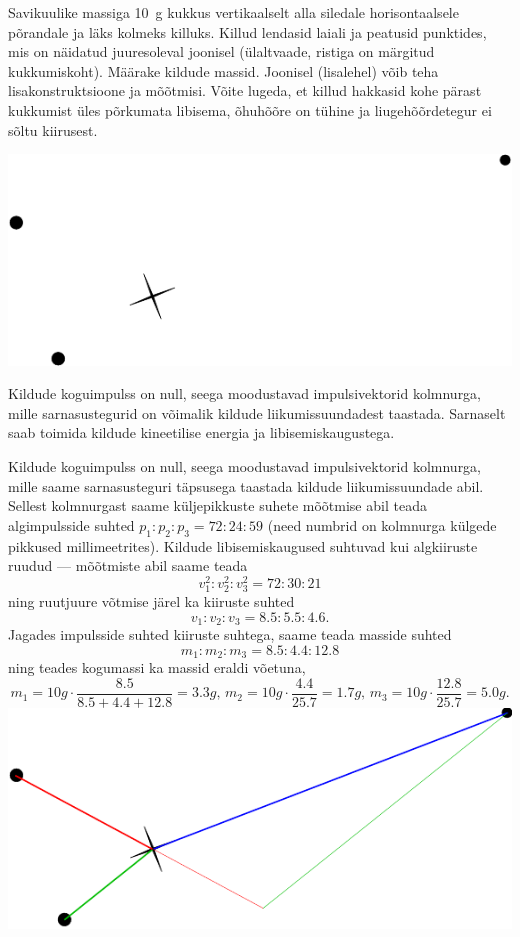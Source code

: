 
Savikuulike massiga \SI{10}{g} kukkus vertikaalselt alla siledale horisontaalsele
põrandale ja läks kolmeks killuks.
Killud lendasid laiali ja peatusid punktides, mis on näidatud juuresoleval
joonisel
(ülaltvaade, ristiga on märgitud kukkumiskoht). Määrake kildude massid.
Joonisel (lisalehel)
võib teha lisakonstruktsioone ja mõõtmisi.
Võite lugeda, et killud hakkasid kohe pärast kukkumist üles põrkumata libisema,
õhuhõõre on tühine ja liugehõõrdetegur ei sõltu kiirusest.
\begin{center}
\includegraphics[width=0.8\linewidth]{2012-lahg-10-killud}
\end{center}

\hint
Kildude koguimpulss on null, seega moodustavad impulsivektorid kolmnurga, mille sarnasustegurid on võimalik kildude liikumissuundadest taastada. Sarnaselt saab toimida kildude kineetilise energia ja libisemiskaugustega.

\solu
Kildude koguimpulss on null, seega moodustavad impulsivektorid kolmnurga, mille saame sarnasusteguri täpsusega taastada kildude liikumissuundade abil.
Sellest kolmnurgast saame küljepikkuste suhete mõõtmise abil teada algimpulsside suhted $p_1 : p_2: p_3 = \num{72} : \num{24} : \num{59}$ (need numbrid on 
kolmnurga külgede pikkused millimeetrites). 
Kildude libisemiskaugused suhtuvad kui algkiiruste ruudud --- mõõtmiste abil saame teada 
\[
v_1^2:v_2^2:v_3^2 = \num{72}:\num{30}:\num{21}
\]
ning ruutjuure võtmise järel ka 
kiiruste suhted
\[
v_1 : v_2: v_3 = \num{8,5}:\num{5,5}:\num{4,6}.
\]
Jagades impulsside suhted kiiruste suhtega, saame teada masside suhted
\[
m_1:m_2:m_3=\num{8,5}:\num{4,4}:\num{12,8}
\]
ning teades kogumassi ka massid eraldi võetuna,
\[
m_1=\SI {10}g\cdot \frac{\num{8,5}}{\num{8,5}+\num{4,4}+\num{12,8}} = \SI{3,3}g\text{, }m_2=\SI {10}g\cdot \frac{\num{4,4}}{\num{25,7}}=\SI{1,7}g\text{, } 
m_3=\SI {10}g\cdot \frac{\num{12,8}}{\num{25,7}}=\SI{5,0}g.
\]
\hspace*{0\columnwidth}\includegraphics[width=\columnwidth]{2012-lahg-10-killud_lah}

